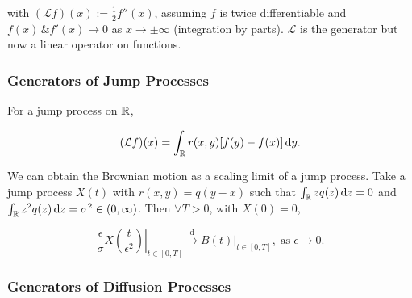 with $(\mathcal{L}f)(x) := \frac{1}{2} f''(x)$, assuming $f$ is twice differentiable and $f(x) \, \& f'(x) \to 0$ as $x \to \pm \infty$ (integration by parts). $\mathcal{L}$ is the generator but now a linear operator on functions.

\subsubsection{Generators of Jump Processes}

For a jump process on $\mathbb{R}$, 

\begin{equation*}
    (\mathcal{L}f)(x) = \int_\mbb{R} r(x,y) [f(y) - f(x)] \dif y.
\end{equation*}

We can obtain the Brownian motion as a scaling limit of a jump process. Take a jump process $X(t)$ with $r(x, y) = q(y-x)$ such that $\int_\mbb{R} z q(z) \dif z = 0$ and $\int_\mbb{R} z^2 q(z) \dif z = \sigma^2 \in (0, \infty)$. Then $\forall T > 0$, with $X(0) = 0$,

\begin{equation*}
    \left. \frac{\epsilon}{\sigma} X(\frac{t}{\epsilon^2}) \right|_{t \in [0, T]} \xrightarrow{\text{d}} \left. B(t) \right|_{t \in [0, T]}, \; \text{as} \; \epsilon \to 0.
\end{equation*}

\subsubsection{Generators of Diffusion Processes}


